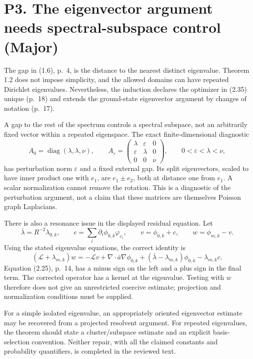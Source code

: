 \documentclass[10pt]{article}
\begin{document}
\section*{P3. The eigenvector argument needs spectral-subspace control (Major)}
The gap in (1.6), p. 4, is the distance to the nearest distinct eigenvalue. Theorem 1.2 does not impose simplicity, and the allowed domains can have repeated Dirichlet eigenvalues. Nevertheless, the induction declares the optimizer in (2.35) unique (p. 18) and extends the ground-state eigenvector argument by changes of notation (p. 17).\par
A gap to the rest of the spectrum controls a spectral subspace, not an arbitrarily fixed vector within a repeated eigenspace. The exact finite-dimensional diagnostic \[A_0=\operatorname{diag}(\lambda,\lambda,\nu),\qquad
 A_\varepsilon=
 \begin{pmatrix}\lambda&\varepsilon&0\\
 \varepsilon&\lambda&0\\0&0&\nu\end{pmatrix},
 \qquad 0<\varepsilon<\lambda<\nu,\] has perturbation norm \(\varepsilon\) and a fixed external gap. Its split eigenvectors, scaled to have inner product one with \(e_1\), are \(e_1\pm e_2\), both at distance one from \(e_1\). A scalar normalization cannot remove the rotation. This is a diagnostic of the perturbation argument, not a claim that these matrices are themselves Poisson graph Laplacians.\par
There is also a resonance issue in the displayed residual equation. Let \[\bar\lambda=R^{-2}\lambda_{0,k},\qquad
 c=\sum_i\partial_i\phi_{0,k}\varphi_{e_i},\qquad
 v=\phi_{0,k}+c,\qquad w=\phi_{m,k}-v.\] Using the stated eigenvalue equations, the correct identity is \[(\mathcal L+\lambda_{m,k})w
 =-\mathcal Lv+\nabla\cdot\bar a\nabla\phi_{0,k}
   +(\bar\lambda-\lambda_{m,k})\phi_{0,k}
   -\lambda_{m,k}c.\] Equation (2.25), p. 14, has a minus sign on the left and a plus sign in the final term. The corrected operator has a kernel at the eigenvalue. Testing with \(w\) therefore does not give an unrestricted coercive estimate; projection and normalization conditions must be supplied.\par
For a simple isolated eigenvalue, an appropriately oriented eigenvector estimate may be recovered from a projected resolvent argument. For repeated eigenvalues, the theorem should state a cluster/subspace estimate and an explicit basis-selection convention. Neither repair, with all the claimed constants and probability quantifiers, is completed in the reviewed text.\par
\end{document}
